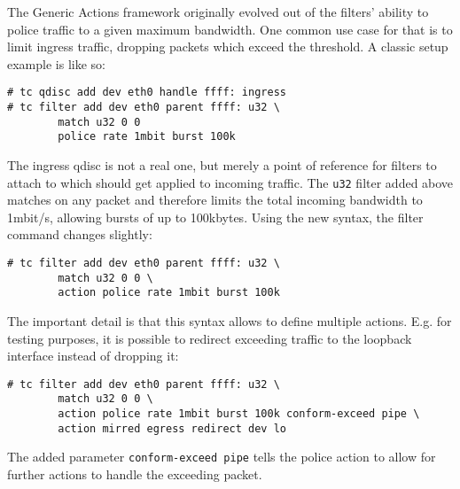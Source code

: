\documentclass[12pt,twoside]{article}
\newcommand{\filter}{\texttt}
\begin{document}
The Generic Actions framework originally evolved out of the filters' ability to
police traffic to a given maximum bandwidth. One common use case for that is to
limit ingress traffic, dropping packets which exceed the threshold. A classic
setup example is like so:
\begin{Verbatim}
# tc qdisc add dev eth0 handle ffff: ingress
# tc filter add dev eth0 parent ffff: u32 \
        match u32 0 0
        police rate 1mbit burst 100k
\end{Verbatim}
The ingress qdisc is not a real one, but merely a point of reference for filters
to attach to which should get applied to incoming traffic. The \filter{u32} filter added
above matches on any packet and therefore limits the total incoming bandwidth to
1mbit/s, allowing bursts of up to 100kbytes. Using the new syntax, the filter
command changes slightly:
\begin{Verbatim}
# tc filter add dev eth0 parent ffff: u32 \
        match u32 0 0 \
        action police rate 1mbit burst 100k
\end{Verbatim}
The important detail is that this syntax allows to define multiple actions.
E.g. for testing purposes, it is possible to redirect exceeding traffic to the
loopback interface instead of dropping it:
\begin{Verbatim}
# tc filter add dev eth0 parent ffff: u32 \
        match u32 0 0 \
        action police rate 1mbit burst 100k conform-exceed pipe \
        action mirred egress redirect dev lo
\end{Verbatim}
The added parameter \texttt{conform-exceed pipe} tells the police action to allow for
further actions to handle the exceeding packet.
\end{document}
